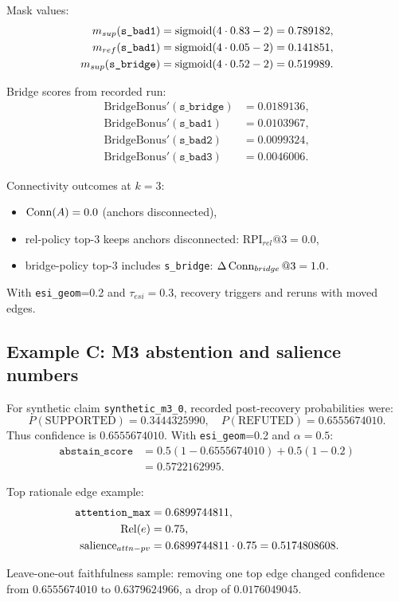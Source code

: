 Mask values:
\begin{align}
 m_{sup}(\texttt{s\_bad1}) &= \operatorname{sigmoid}(4\cdot0.83-2)=0.789182, \\
 m_{ref}(\texttt{s\_bad1}) &= \operatorname{sigmoid}(4\cdot0.05-2)=0.141851, \\
 m_{sup}(\texttt{s\_bridge}) &= \operatorname{sigmoid}(4\cdot0.52-2)=0.519989.
\end{align}

Bridge scores from recorded run:
\begin{align}
\text{BridgeBonus}'(\texttt{s\_bridge}) &= 0.0189136, \\
\text{BridgeBonus}'(\texttt{s\_bad1}) &= 0.0103967, \\
\text{BridgeBonus}'(\texttt{s\_bad2}) &= 0.0099324, \\
\text{BridgeBonus}'(\texttt{s\_bad3}) &= 0.0046006.
\end{align}

Connectivity outcomes at $k=3$:
\begin{itemize}
\item $\operatorname{Conn}(A)=0.0$ (anchors disconnected),
\item rel-policy top-3 keeps anchors disconnected: $\text{RPI}_{rel}@3=0.0$,
\item bridge-policy top-3 includes \texttt{s\_bridge}: $\Delta\operatorname{Conn}_{bridge}@3=1.0$.
\end{itemize}
With \texttt{esi\_geom}=0.2 and $\tau_{esi}=0.3$, recovery triggers and reruns with moved edges.

\subsection{Example C: M3 abstention and salience numbers}
For synthetic claim \texttt{synthetic\_m3\_0}, recorded post-recovery probabilities were:
\[
P(\text{SUPPORTED})=0.3444325990,\quad P(\text{REFUTED})=0.6555674010.
\]
Thus confidence is $0.6555674010$.
With \texttt{esi\_geom}=0.2 and $\alpha=0.5$:
\begin{align}
\texttt{abstain\_score}
&=0.5(1-0.6555674010)+0.5(1-0.2) \\
&=0.5722162995.
\end{align}

Top rationale edge example:
\begin{align}
\texttt{attention\_max} &= 0.6899744811, \\
\operatorname{Rel}(e) &= 0.75, \\
\text{salience}_{attn-pv} &= 0.6899744811\cdot0.75=0.5174808608.
\end{align}

Leave-one-out faithfulness sample:
removing one top edge changed confidence from $0.6555674010$ to $0.6379624966$,
a drop of $0.0176049045$.

